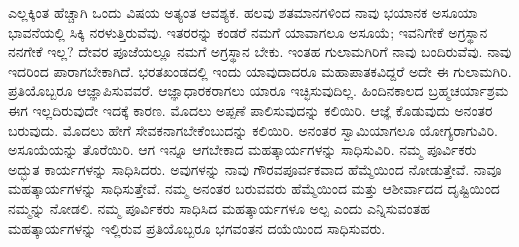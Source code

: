 \vskip 5pt

ಎಲ್ಲಕ್ಕಿಂತ ಹೆಚ್ಚಾಗಿ ಒಂದು ವಿಷಯ ಅತ್ಯಂತ ಆವಶ್ಯಕ. ಹಲವು ಶತಮಾನಗಳಿಂದ ನಾವು ಭಯಾನಕ ಅಸೂಯಾ ಭಾವನೆಯಲ್ಲಿ ಸಿಕ್ಕಿ ನರಳುತ್ತಿರುವೆವು. ಇತರರನ್ನು ಕಂಡರೆ ನಮಗೆ ಯಾವಾಗಲೂ ಅಸೂಯೆ; ಇವನಿಗೇಕೆ ಅಗ್ರಸ್ಥಾನ ನನಗೇಕೆ ಇಲ್ಲ? ದೇವರ ಪೂಜೆಯಲ್ಲೂ ನಮಗೆ ಅಗ್ರಸ್ಥಾನ ಬೇಕು. ಇಂತಹ ಗುಲಾಮಗಿರಿಗೆ ನಾವು ಬಂದಿರುವೆವು. ನಾವು ಇದರಿಂದ ಪಾರಾಗಬೇಕಾಗಿದೆ. ಭರತಖಂಡದಲ್ಲಿ ಇಂದು ಯಾವುದಾದರೂ ಮಹಾಪಾತಕವಿದ್ದರೆ ಅದೇ ಈ ಗುಲಾಮಗಿರಿ. ಪ್ರತಿಯೊಬ್ಬರೂ ಆಜ್ಞಾಪಿಸುವವರೆ. ಆಜ್ಞಾಧಾರಕರಾಗಲು ಯಾರೂ ಇಚ್ಛಿಸುವುದಿಲ್ಲ. ಹಿಂದಿನಕಾಲದ ಬ್ರಹ್ಮಚರ್ಯಾಶ್ರಮ ಈಗ ಇಲ್ಲದಿರುವುದೇ ಇದಕ್ಕೆ ಕಾರಣ. ಮೊದಲು ಅಪ್ಪಣೆ ಪಾಲಿಸುವುದನ್ನು ಕಲಿಯಿರಿ. ಆಜ್ಞೆ ಕೊಡುವುದು ಅನಂತರ ಬರುವುದು. ಮೊದಲು ಹೇಗೆ ಸೇವಕನಾಗಬೇಕೆಂಬುದನ್ನು ಕಲಿಯಿರಿ. ಅನಂತರ ಸ್ವಾಮಿಯಾಗಲೂ ಯೋಗ್ಯರಾಗುವಿರಿ. ಅಸೂಯೆಯನ್ನು ತೊರೆಯಿರಿ. ಆಗ ಇನ್ನೂ ಆಗಬೇಕಾದ ಮಹತ್ಕಾರ್ಯಗಳನ್ನು ಸಾಧಿಸುವಿರಿ. ನಮ್ಮ ಪೂರ್ವಿಕರು ಅದ್ಭುತ ಕಾರ್ಯಗಳನ್ನು ಸಾಧಿಸಿದರು. ಅವುಗಳನ್ನು ನಾವು ಗೌರವಪೂರ್ವಕವಾದ ಹೆಮ್ಮೆಯಿಂದ ನೋಡುತ್ತೇವೆ. ನಾವೂ ಮಹತ್ಕಾರ್ಯಗಳನ್ನು ಸಾಧಿಸುತ್ತೇವೆ. ನಮ್ಮ ಅನಂತರ ಬರುವವರು ಹೆಮ್ಮೆಯಿಂದ ಮತ್ತು ಆಶೀರ್ವಾದದ ದೃಷ್ಟಿಯಿಂದ ನಮ್ಮನ್ನು ನೋಡಲಿ. ನಮ್ಮ ಪೂರ್ವಿಕರು ಸಾಧಿಸಿದ ಮಹತ್ಕಾರ್ಯಗಳೂ ಅಲ್ಪ ಎಂದು ಎನ್ನಿಸುವಂತಹ ಮಹತ್ಕಾರ್ಯಗಳನ್ನು ಇಲ್ಲಿರುವ ಪ್ರತಿಯೊಬ್ಬರೂ ಭಗವಂತನ ದಯೆಯಿಂದ ಸಾಧಿಸುವರು.

